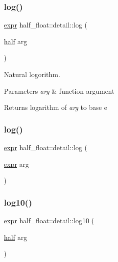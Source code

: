 \subsubsection{\texorpdfstring{log()}{log()}\hspace{0.1cm}{\footnotesize\ttfamily [1/2]}}
{\footnotesize\ttfamily \hyperlink{structhalf__float_1_1detail_1_1expr}{expr} half\+\_\+float\+::detail\+::log (\begin{DoxyParamCaption}\item[{\hyperlink{classhalf__float_1_1half}{half}}]{arg }\end{DoxyParamCaption})\hspace{0.3cm}{\ttfamily [inline]}}

Natural logorithm. 
\begin{DoxyParams}{Parameters}
{\em arg} & function argument \\
\hline
\end{DoxyParams}
\begin{DoxyReturn}{Returns}
logarithm of {\itshape arg} to base e 
\end{DoxyReturn}
\mbox{\label{namespacehalf__float_1_1detail_a8682019f0663d47925c56bff848c30f2}} 
\subsubsection{\texorpdfstring{log()}{log()}\hspace{0.1cm}{\footnotesize\ttfamily [2/2]}}
{\footnotesize\ttfamily \hyperlink{structhalf__float_1_1detail_1_1expr}{expr} half\+\_\+float\+::detail\+::log (\begin{DoxyParamCaption}\item[{\hyperlink{structhalf__float_1_1detail_1_1expr}{expr}}]{arg }\end{DoxyParamCaption})\hspace{0.3cm}{\ttfamily [inline]}}

\mbox{\label{namespacehalf__float_1_1detail_ad8d7b7769a3053dd74344ca0b122bb7b}} 
\subsubsection{\texorpdfstring{log10()}{log10()}\hspace{0.1cm}{\footnotesize\ttfamily [1/2]}}
{\footnotesize\ttfamily \hyperlink{structhalf__float_1_1detail_1_1expr}{expr} half\+\_\+float\+::detail\+::log10 (\begin{DoxyParamCaption}\item[{\hyperlink{classhalf__float_1_1half}{half}}]{arg }\end{DoxyParamCaption})\hspace{0.3cm}{\ttfamily [inline]}}

